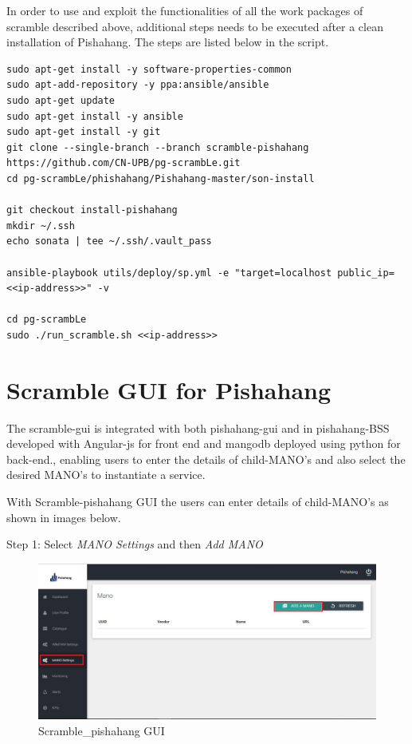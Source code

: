 In order to use and exploit the functionalities of all the work packages of scramble described above, additional steps needs to be executed after a clean installation of Pishahang. The steps are listed below in the script.
\begin{lstlisting}[caption= install Pishahang with scramble, label=lis:Pishahang_scramble]
sudo apt-get install -y software-properties-common
sudo apt-add-repository -y ppa:ansible/ansible
sudo apt-get update
sudo apt-get install -y ansible
sudo apt-get install -y git
git clone --single-branch --branch scramble-pishahang https://github.com/CN-UPB/pg-scrambLe.git
cd pg-scrambLe/phishahang/Pishahang-master/son-install

git checkout install-pishahang
mkdir ~/.ssh
echo sonata | tee ~/.ssh/.vault_pass

ansible-playbook utils/deploy/sp.yml -e "target=localhost public_ip=<<ip-address>>" -v

cd pg-scrambLe
sudo ./run_scramble.sh <<ip-address>>

\end{lstlisting}

\section{Scramble GUI for Pishahang}
The scramble-gui is integrated with both pishahang-gui and in pishahang-BSS developed with Angular-js for front end and mangodb deployed using python for back-end., enabling users to enter the details of child-MANO's and also select the desired MANO's to instantiate a service.

With Scramble-pishahang GUI the users can enter details of child-MANO's as shown in images below.

Step 1: Select \textit{MANO Settings} and then \textit{Add MANO}
\begin{figure}[H]
	\centering
	\includegraphics[width=1\linewidth]{"figures/son-gui-step-1"}
	\caption{Scramble\_pishahang GUI}
	\label{fig:sequence-diagram-scramble}
\end{figure}

